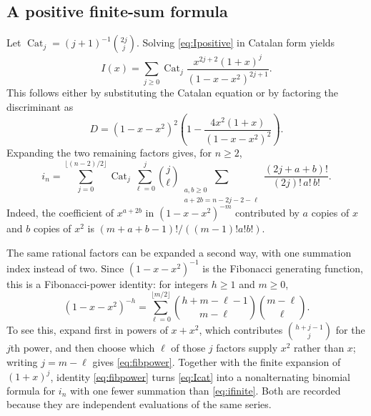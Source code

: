 \documentclass[11pt,letterpaper]{article}
\numberwithin{equation}{section}
\theoremstyle{definition}
\newcommand{\Cat}{\operatorname{Cat}}
\newcommand{\coeff}[2]{[#1^{#2}]}
\begin{document}
\subsection{A positive finite-sum formula}

Let $\Cat_j=(j+1)^{-1}\binom{2j}{j}$. Solving
\eqref{eq:Ipositive} in Catalan form yields
\begin{equation}
 I(x)=\sum_{j\ge0}\Cat_j
   \frac{x^{2j+2}(1+x)^j}{(1-x-x^2)^{2j+1}}.
 \label{eq:Icat}
\end{equation}
This follows either by substituting the Catalan equation or by factoring
the discriminant as
\[
 D=(1-x-x^2)^2
  \left(1-\frac{4x^2(1+x)}{(1-x-x^2)^2}\right).
\]
Expanding the two remaining factors gives, for $n\ge2$,
\begin{equation}
 \boxed{\displaystyle
 i_n=\sum_{j=0}^{\lfloor(n-2)/2\rfloor}\Cat_j
      \sum_{\ell=0}^{j}\binom j\ell
      \sum_{\substack{a,b\ge0\\a+2b=n-2j-2-\ell}}
       \frac{(2j+a+b)!}{(2j)!\,a!\,b!}.}
 \label{eq:ifinite}
\end{equation}
Indeed, the coefficient of $x^{a+2b}$ in
$(1-x-x^2)^{-m}$ contributed by $a$ copies of $x$ and $b$ copies of
$x^2$ is $(m+a+b-1)!/((m-1)!a!b!)$.

The same rational factors can be expanded a second way, with one summation
index instead of two. Since $(1-x-x^2)^{-1}$ is the Fibonacci generating
function, this is a Fibonacci-power identity: for integers $h\ge1$ and
$m\ge0$,
\begin{equation}
 \coeff{x}{m}(1-x-x^2)^{-h}
 =\sum_{\ell=0}^{\lfloor m/2\rfloor}
   \binom{h+m-\ell-1}{m-\ell}\binom{m-\ell}{\ell}.
 \label{eq:fibpower}
\end{equation}
To see this, expand first in powers of $x+x^2$, which contributes
$\binom{h+j-1}{j}$ for the $j$th power, and then choose which $\ell$ of
those $j$ factors supply $x^2$ rather than $x$; writing $j=m-\ell$ gives
\eqref{eq:fibpower}. Together with the finite expansion of $(1+x)^j$,
identity \eqref{eq:fibpower} turns \eqref{eq:Icat} into a nonalternating
binomial formula for $i_n$ with one fewer summation than
\eqref{eq:ifinite}. Both are recorded because they are independent
evaluations of the same series.
\end{document}
